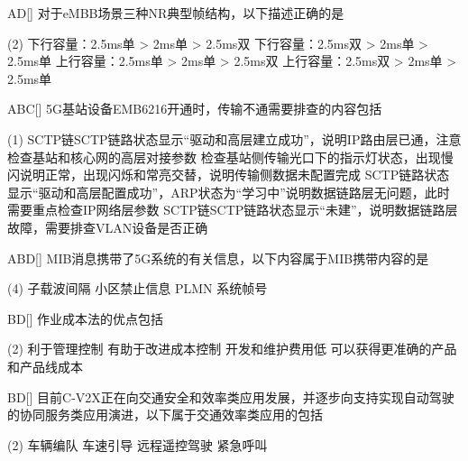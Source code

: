 \begin{choice}{\;AD\;}[]
    对于eMBB场景三种NR典型帧结构，以下描述正确的是
    \begin{tasks}(2)
        \task 下行容量：2.5ms单 > 2ms单 > 2.5ms双
        \task 下行容量：2.5ms双 > 2ms单 > 2.5ms单
        \task 上行容量：2.5ms单 > 2ms单 > 2.5ms双
        \task 上行容量：2.5ms双 > 2ms单 > 2.5ms单
    \end{tasks}
\end{choice}

\begin{choice}{\;ABC\;}[]
    5G基站设备EMB6216开通时，传输不通需要排查的内容包括
    \begin{tasks}(1)
        \task SCTP链SCTP链路状态显示“驱动和高层建立成功”，说明IP路由层已通，注意检查基站和核心网的高层对接参数
        \task 检查基站侧传输光口下的指示灯状态，出现慢闪说明正常，出现闪烁和常亮交替，说明传输侧数据未配置完成
        \task SCTP链路状态显示“驱动和高层配置成功”，ARP状态为“学习中”说明数据链路层无问题，此时需要重点检查IP网络层参数
        \task SCTP链SCTP链路状态显示“未建”，说明数据链路层故障，需要排查VLAN设备是否正确
    \end{tasks}
\end{choice}

\begin{choice}{\;ABD\;}[]
    MIB消息携带了5G系统的有关信息，以下内容属于MIB携带内容的是
    \begin{tasks}(4)
        \task 子载波间隔
        \task 小区禁止信息
        \task PLMN
        \task 系统帧号
    \end{tasks}
\end{choice}

\begin{choice}{\;BD\;}[]
    作业成本法的优点包括
    \begin{tasks}(2)
        \task 利于管理控制
        \task 有助于改进成本控制
        \task 开发和维护费用低
        \task 可以获得更准确的产品和产品线成本
    \end{tasks}
\end{choice}


\begin{choice}{\;BD\;}[]
    目前C-V2X正在向交通安全和效率类应用发展，并逐步向支持实现自动驾驶的协同服务类应用演进，以下属于交通效率类应用的包括
    \begin{tasks}(2)
        \task 车辆编队
        \task 车速引导
        \task 远程遥控驾驶
        \task 紧急呼叫
    \end{tasks}
\end{choice}


